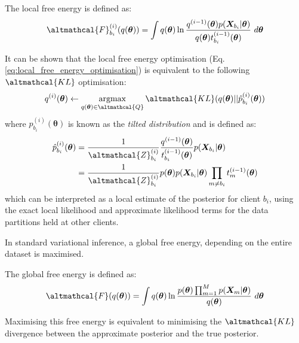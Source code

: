 \begin{definition}
	The local free energy is defined as:
	\begin{align}
	\altmathcal{F}_{b_i}^{(i)}(q(\bm{\theta})) = \int q(\bm{\theta}) \ln \frac{q^{(i-1)}(\bm{\theta}) p(\bm{X}_{b_i}|\bm{\theta})}{q(\bm{\theta}) t_{b_i}^{(i-1)}(\bm{\theta})}\ d\bm{\theta}
	\end{align}
\end{definition}
It can be shown that the local free energy optimisation (Eq. \ref{eq:local_free_energy_optimisation}) is equivalent to the following $\altmathcal{KL}$ optimisation:
\begin{align}
q^{(i)}(\bm{\theta}) \leftarrow  \mathop{\mathrm{argmax}}_{q(\bm{\theta}) \in \altmathcal{Q}} \altmathcal{KL}(q(\bm{\theta}) || \hat{p}^{(i)}_{b_i}(\bm{\theta}))
\end{align}
where $\hat{p}^{(i)}_{b_i}(\bm{\theta})$ is known as the \emph{tilted distribution} and is defined as:
\begin{align}
\hat{p}^{(i)}_{b_i}(\bm{\theta}) &= \frac{1}{\altmathcal{Z}^{(i)}_{b_i}} \frac{q^{(i-1)}(\bm{\theta})}{t_{b_i}^{(i-1)}(\bm{\theta})} p(\bm{X}_{b_i}|\bm{\theta}) \\ &=  \frac{1}{\altmathcal{Z}^{(i)}_{b_i}} p(\bm{\theta}) p(\bm{X}_{b_i}| \bm{\theta}) \prod_{m \neq b_i} t_m^{(i-1)}(\bm{\theta})
\end{align}
which can be interpreted as a local estimate of the posterior for client $b_i$, using the exact local likelihood and approximate likelihood terms for the data partitions held at other clients.  

In standard variational inference, a global free energy, depending on the entire dataset is maximised. 
\begin{definition}
	The global free energy is defined as:
	\begin{align}
	\altmathcal{F}(q(\bm{\theta})) = \int q(\bm{\theta}) \ln \frac{p(\bm{\theta})\prod_{m=1}^M p(\bm{X}_m | \bm{\theta})}{q(\bm{\theta})}\ d\bm{\theta}
	\end{align}
\end{definition}
Maximising this free energy is equivalent to minimising the $\altmathcal{KL}$ divergence between the approximate posterior and the true posterior. \cite{Bishop:2006}

